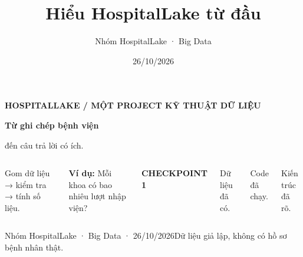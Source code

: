 \documentclass[aspectratio=169,11pt]{beamer}
\title{Hiểu HospitalLake từ đầu}
\author{Nhóm HospitalLake · Big Data}
\date{26/10/2026}
\renewcommand{\normalsize}{\fontsize{21}{28}\selectfont}
\renewcommand{\small}{\fontsize{18}{24}\selectfont}
\renewcommand{\footnotesize}{\fontsize{13}{17}\selectfont}
\newcommand{\labeltext}[1]{{\fontsize{13}{17}\selectfont\bfseries\color{teal}#1}}
\begin{document}
\normalsize

\begin{frame}[plain]
  \vspace{8mm}
  \labeltext{HOSPITALLAKE / MỘT PROJECT KỸ THUẬT DỮ LIỆU}\par
  \vspace{9mm}
  {\fontsize{44}{52}\selectfont\bfseries Từ ghi chép bệnh viện\par đến câu trả lời có ích.\par}
  \vspace{10mm}
  \begin{columns}[T,onlytextwidth]
      Gom dữ liệu → kiểm tra → tính số liệu.\par\vspace{5mm}
      \textbf{Ví dụ:} Mỗi khoa có bao nhiêu lượt nhập viện?\par
      \labeltext{CHECKPOINT 1}\par\vspace{3mm}
      {\small Dữ liệu đã có.\par Code đã chạy.\par Kiến trúc đã rõ.}
  \end{columns}
  \vfill
  {\footnotesize Nhóm HospitalLake · Big Data · 26/10/2026\hfill Dữ liệu giả lập, không có hồ sơ bệnh nhân thật.}
\end{frame}
\end{document}
